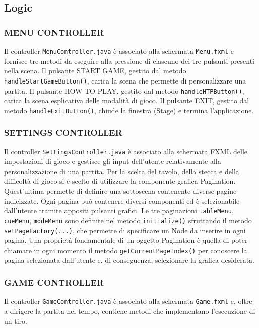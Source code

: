 \documentclass[12pt,a4paper]{report}
\begin{document}
\subsection{Logic} \label{se:Logic} %

\subsubsection*{MENU CONTROLLER}
Il controller \texttt{MenuController.java} è associato alla schermata \texttt{Menu.fxml} e fornisce tre metodi da eseguire alla pressione di ciascuno dei tre pulsanti presenti nella scena.
Il pulsante START GAME, gestito dal metodo \texttt{handleStartGameButton()}, carica la scena che permette di personalizzare una partita.
Il pulsante HOW TO PLAY, gestito dal metodo \texttt{handleHTPButton()}, carica la scena esplicativa delle modalità di gioco.
Il pulsante EXIT, gestito dal metodo \texttt{handleExitButton()}, chiude la finestra (Stage) e termina l'applicazione.

\subsubsection*{SETTINGS CONTROLLER}
Il controller \texttt{SettingsController.java} è associato alla schermata FXML delle impostazioni di gioco e gestisce gli input dell'utente relativamente alla personalizzazione di una partita.
Per la scelta del tavolo, della stecca e della difficoltà di gioco si è scelto di utilizzare la componente grafica Pagination.
Quest'ultima permette di definire una sottoscena contenente diverse pagine indicizzate.
Ogni pagina può contenere diversi componenti ed è selezionabile dall'utente tramite appositi pulsanti grafici.
Le tre paginazioni \texttt{tableMenu}, \texttt{cueMenu}, \texttt{modeMenu} sono definite nel metodo \texttt{initialize()} sfruttando il metodo \texttt{setPageFactory(...)}, che permette di specificare un Node da inserire in ogni pagina.
Una proprietà fondamentale di un oggetto Pagination è quella di poter chiamare in ogni momento il metodo \texttt{getCurrentPageIndex()} per conoscere la pagina selezionata dall'utente e, di conseguenza, selezionare la grafica desiderata.

\subsubsection*{GAME CONTROLLER}
Il controller \texttt{GameController.java} è associato alla schermata \texttt{Game.fxml} e, oltre a dirigere la partita nel tempo, contiene metodi che implementano l'esecuzione di un tiro.
\end{document}
